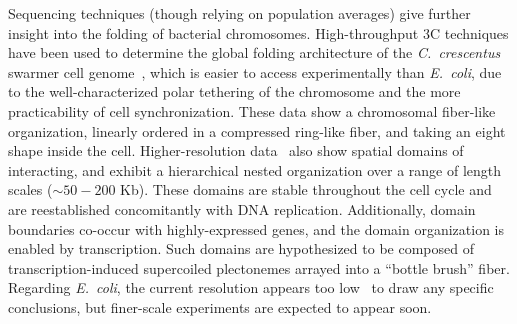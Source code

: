 \documentclass[
preprint,
a4paper,
12pt,
superscriptaddress,
pre]{revtex4}
\begin{document}
Sequencing techniques (though relying on population averages) give
further insight into the folding of bacterial chromosomes.
High-throughput 3C techniques have been used to determine the global
folding architecture of the \emph{C.~crescentus} swarmer cell
genome~\cite{Le2013,Umbarger2011}, which is easier to access
experimentally than \emph{E.~coli}, due to the well-characterized
polar tethering of the chromosome and
%
the more practicability of cell synchronization.
%
These data show a chromosomal fiber-like organization, linearly
ordered in a compressed ring-like fiber, and taking an eight shape
inside the cell.
%
Higher-resolution data~\cite{Le2013} also show spatial domains of
interacting, and exhibit a hierarchical nested organization over a
range of length scales ($\sim50-200$ Kb). These domains are stable
throughout the cell cycle and are reestablished concomitantly with DNA
replication.  Additionally, domain boundaries co-occur with
highly-expressed genes, and the domain organization is enabled by
transcription. Such domains are hypothesized to be composed of
transcription-induced supercoiled plectonemes arrayed into a ``bottle
brush'' fiber.
Regarding \emph{E.~coli}, the current resolution appears too
low~\cite{Cagliero2013} to draw any specific conclusions, but
finer-scale experiments are expected to appear soon.
\end{document}
